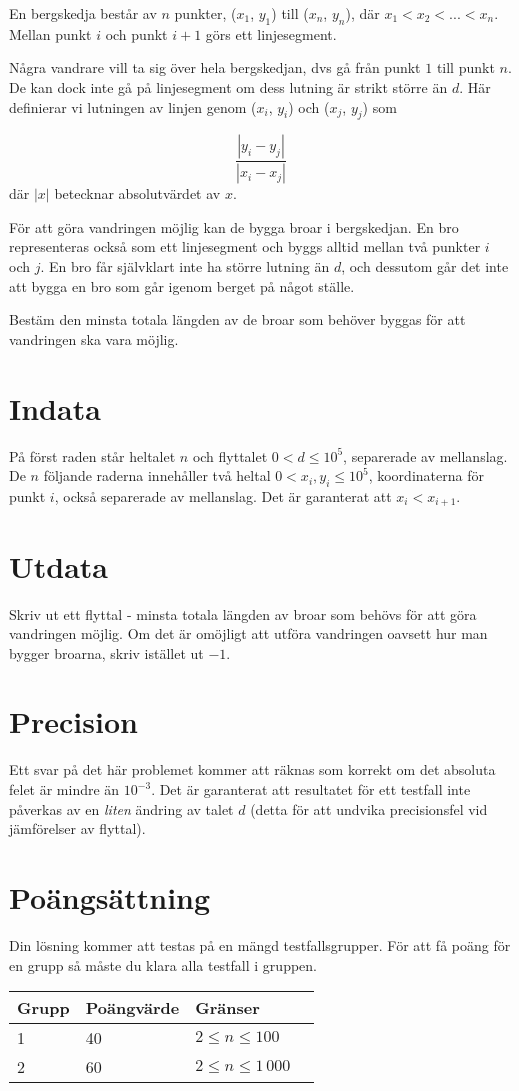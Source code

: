 En bergskedja består av $n$ punkter, ($x_1$, $y_1$) till ($x_n$, $y_n$), där $x_1 < x_2 < ... < x_n$. Mellan punkt $i$ och punkt $i+1$ görs ett linjesegment.

Några vandrare vill ta sig över hela bergskedjan, dvs gå från punkt $1$ till punkt $n$. De kan dock inte gå på linjesegment om dess lutning är strikt större än $d$. Här definierar vi lutningen av linjen genom ($x_i$, $y_i$) och ($x_j$, $y_j$) som

$$
\frac{|y_i - y_j|}{|x_i - x_j|}
$$
där $|x|$ betecknar absolutvärdet av $x$.

För att göra vandringen möjlig kan de bygga broar i bergskedjan. En bro representeras också som ett linjesegment och byggs alltid mellan två punkter $i$ och $j$. En bro får självklart inte ha större lutning än $d$, och dessutom går det inte att bygga en bro som går igenom berget på något ställe.

Bestäm den minsta totala längden av de broar som behöver byggas för att vandringen ska vara möjlig.

\section*{Indata}
På först raden står heltalet $n$ och flyttalet $0 < d \le 10^5$, separerade av mellanslag.
De $n$ följande raderna innehåller två heltal $0 < x_i, y_i \le 10^5$, koordinaterna för punkt $i$, också separerade av mellanslag. Det är garanterat att $x_i < x_{i+1}$.

\section*{Utdata}
Skriv ut ett flyttal - minsta totala längden av broar som behövs för att göra vandringen möjlig.
Om det är omöjligt att utföra vandringen oavsett hur man bygger broarna, skriv istället ut $-1$.

\section*{Precision}
Ett svar på det här problemet kommer att räknas som korrekt om det absoluta felet är mindre än $10^{-3}$. Det är garanterat att resultatet för ett testfall inte påverkas av en \emph{liten} ändring av talet $d$ (detta för att undvika precisionsfel vid jämförelser av flyttal).

\section*{Poängsättning}

Din lösning kommer att testas på en mängd testfallsgrupper. För att få poäng för en grupp
så måste du klara alla testfall i gruppen.

\begin{tabular}{| l | l | l | l |}
\hline
Grupp & Poängvärde & Gränser \\ \hline
1     & 40         & $ 2 \le n \le 100$ \\ \hline
2     & 60         & $ 2 \le n \le 1\,000$ \\ \hline
\end{tabular}
